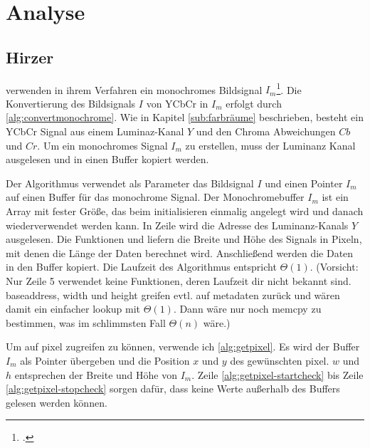 \section{Analyse} %
\label{sec:analyse}
\begin{comment}
	Detailierte Beschreibung der Algorithmen inkl. O-Notation (Nitty-Gritty Darstellung der Algos)
	1. ARToolKit
	2. ARToolKitPlus
	3. Zissermann/Clarke
	Analyse: Die auswertung nach den Kriterein aus Kap. Vorgehen OHNE WERTUNG! Nur die Daten erheben und auswerten.
\end{comment}

\subsection{Hirzer} %
\label{sub:hirzer}

\citeauthor{clarke96} verwenden in ihrem Verfahren ein monochromes Bildsignal $I_m$\footcite[Vgl.][S.~417]{clarke96}.
 Die Konvertierung des Bildsignals $I$ von YCbCr in $I_m$ erfolgt durch \autoref{alg:convertmonochrome}. Wie in Kapitel
 \ref{sub:farbräume} beschrieben, besteht ein YCbCr Signal aus einem Luminaz-Kanal $Y$ und den Chroma
 Abweichungen $Cb$ und $Cr$. Um ein monochromes Signal $I_m$ zu erstellen, muss der Luminanz Kanal ausgelesen und in
 einen Buffer kopiert werden.



Der Algorithmus verwendet als Parameter das Bildsignal $I$ und einen Pointer $I_m$ auf einen Buffer für das monochrome
 Signal. Der Monochromebuffer $I_m$ ist ein Array mit fester Größe, das beim initialisieren einmalig angelegt wird und
 danach wiederverwendet werden kann. In Zeile
  wird die Adresse des Luminanz-Kanals
 $Y$ ausgelesen. Die Funktionen  und  liefern die Breite und Höhe des Signals in
 Pixeln, mit denen die Länge der Daten berechnet wird. Anschließend werden die Daten in den Buffer kopiert. Die
 Laufzeit des Algorithmus entspricht $\Theta(1)$. (Vorsicht: Nur Zeile 5 verwendet keine Funktionen, deren Laufzeit dir
 nicht bekannt sind. baseaddress, width und height greifen evtl. auf metadaten zurück und wären damit ein einfacher
 lookup mit $\Theta(1)$. Dann wäre nur noch memcpy zu bestimmen, was im schlimmsten Fall $\Theta(n)$ wäre.)

Um auf \gls{pixel} zugreifen zu können, verwende ich \autoref{alg:getpixel}. Es wird der Buffer $I_m$ als Pointer
 übergeben und die Position $x$ und $y$ des gewünschten \gls{pixel}. $w$ und $h$ entsprechen der Breite und Höhe von
 $I_m$. Zeile \ref{alg:getpixel-startcheck} bis Zeile \ref{alg:getpixel-stopcheck} sorgen dafür, dass keine Werte
 außerhalb des Buffers gelesen werden können.

